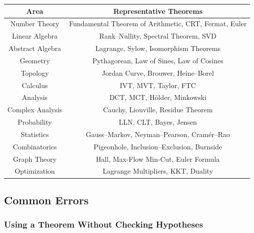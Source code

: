 \begin{center}
\begin{tabular}{c|c}
\textbf{Area}
&
\textbf{Representative Theorems}
\\ \hline

Number Theory
&
Fundamental Theorem of Arithmetic, CRT, Fermat, Euler
\\

Linear Algebra
&
Rank--Nullity, Spectral Theorem, SVD
\\

Abstract Algebra
&
Lagrange, Sylow, Isomorphism Theorems
\\

Geometry
&
Pythagorean, Law of Sines, Law of Cosines
\\

Topology
&
Jordan Curve, Brouwer, Heine--Borel
\\

Calculus
&
IVT, MVT, Taylor, FTC
\\

Analysis
&
DCT, MCT, Hölder, Minkowski
\\

Complex Analysis
&
Cauchy, Liouville, Residue Theorem
\\

Probability
&
LLN, CLT, Bayes, Jensen
\\

Statistics
&
Gauss--Markov, Neyman--Pearson, Cramér--Rao
\\

Combinatorics
&
Pigeonhole, Inclusion--Exclusion, Burnside
\\

Graph Theory
&
Hall, Max-Flow Min-Cut, Euler Formula
\\

Optimization
&
Lagrange Multipliers, KKT, Duality
\end{tabular}
\end{center}

\subsection{Common Errors}
\label{subsec:common-theorem-errors}

\subsubsection{Using a Theorem Without Checking Hypotheses}

